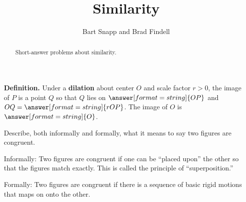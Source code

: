 \documentclass[nooutcomes]{ximera}
\title{Similarity}
\author{Bart Snapp and Brad Findell}
\begin{document}
\begin{abstract}
Short-answer problems about similarity. 
\end{abstract}
\maketitle




%
%
%
%

\begin{question}
\textbf{Definition.} Under a \textbf{dilation} about center $O$ and scale factor $r>0$, the image of $P$ is 
a point $Q$ so that $Q$ lies on  
$\answer[format=string]{OP}$ %
and $OQ=\answer[format=string]{rOP}$.  The image of $O$ is $\answer[format=string]{O}$. 
\end{question}


\begin{question}
Describe, both informally and formally, what it means to say two figures are congruent.
\begin{freeResponse}
\begin{hint}
Informally:  Two figures are congruent if one can be ``placed upon'' the other so that the figures match exactly.  This is called the principle of ``superposition.''  

Formally:  Two figures are congruent if there is a sequence of basic rigid motions that maps on onto the other.  
\end{hint}
\end{freeResponse}
\end{question}
\end{document}
